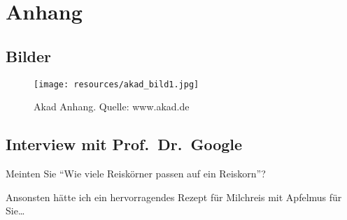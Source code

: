 \chapter{Anhang}

\section{Bilder}
\begin{figure}[H]
  \begin{center}
    \texttt{[image: resources/akad\_bild1.jpg]}
    \caption[Akad Anhang]{Akad Anhang. Quelle: www.akad.de}
  \end{center}
\end{figure}

\section{Interview mit Prof.~Dr.~Google}
\begin{faq}
  {
    Meinten Sie ``Wie viele Reiskörner passen auf ein Reiskorn''?\par{}
    Ansonsten hätte ich ein hervorragendes Rezept für Milchreis mit Apfelmus für Sie\ldots
  }
\end{faq}

%
